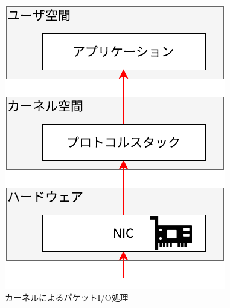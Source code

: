 \begin{figure}[htb]
  \centering
  \includegraphics[width=0.5\columnwidth]{pictures/KernelPacketIO.pdf}
  \caption{カーネルによるパケットI/O処理}
  \label{fig:KernelPacketIO}
\end{figure}
